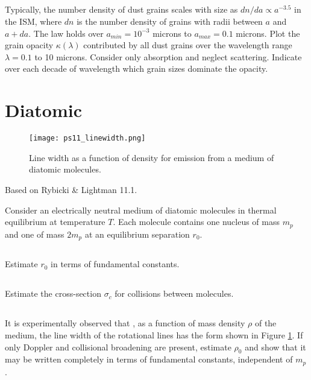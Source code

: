 \documentclass[11pt]{article}
\begin{document}
\subsection{}
Typically, the number density of dust grains scales with size as $dn/da\propto a^{-3.5}$ in
the ISM, where $dn$ is the number density of grains with radii between $a$ and $a+da$.  The
law holds over $a_{min}=10^{-3}$ microns to $a_{max}=0.1$ microns.  Plot the grain opacity
$\kappa(\lambda)$ contributed by all dust grains over the wavelength range $\lambda=0.1$ to
10 microns.  Consider only absorption and neglect scattering.  Indicate over each decade of
wavelength which grain sizes dominate the opacity.


\section{Diatomic}

\begin{figure}[!ht]\centering
\texttt{[image: ps11\_linewidth.png]}
\caption{
Line width as a function of density for emission from a medium of diatomic molecules.
}\label{fig:linewidth}
\end{figure}

Based on Rybicki \& Lightman 11.1.

Consider an electrically neutral medium of diatomic molecules in thermal equilibrium at
temperature $T$.  Each molecule contains one nucleus of mass $m_p$ and one of mass $2m_p$
at an equilibrium separation $r_0$.

\subsection{}
Estimate $r_0$ in terms of fundamental constants.

\subsection{}
Estimate the cross-section $\sigma_c$ for collisions between molecules.

\subsection{}

It is experimentally observed that , as a function of mass density $\rho$ of
the medium, the line width of the rotational lines has the form
shown in Figure \ref{fig:linewidth}.  If only Doppler and collisional broadening
are present, estimate $\rho_0$ and show that it may be written completely in
terms of fundamental constants, independent of $m_p$. 
\end{document}

